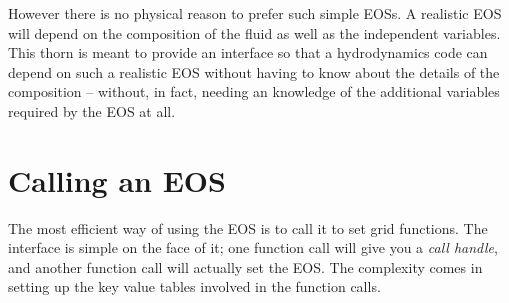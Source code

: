 However there is no physical reason to prefer such simple EOSs. A
realistic EOS will depend on the composition of the fluid as well as
the independent variables. This thorn is meant to provide an interface
so that a hydrodynamics code can depend on such a realistic EOS
without having to know about the details of the composition --
without, in fact, needing an knowledge of the additional variables
required by the EOS at all.

\section{Calling an EOS}

The most efficient way of using the EOS is to call it to set grid
functions. The interface is simple on the face of it; one function
call will give you a {\em call handle}, and another function call will
actually set the EOS. The complexity comes in setting up the key value
tables involved in the function calls.

